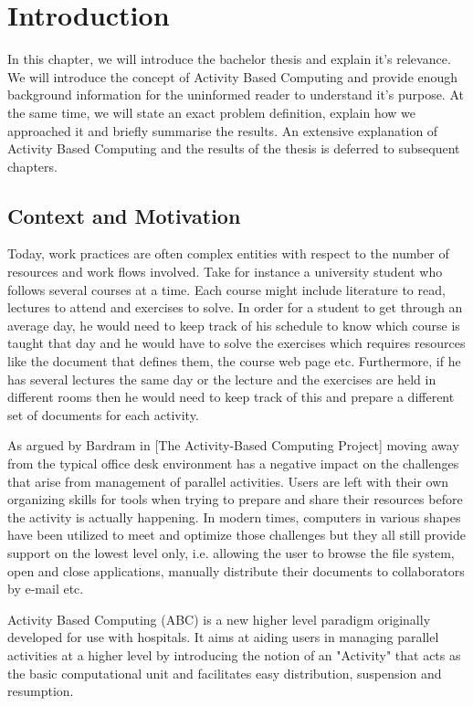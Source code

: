\chapter{Introduction}
In this chapter, we will introduce the bachelor thesis and explain it's relevance. We will introduce the concept of Activity Based Computing and provide enough background information for the uninformed reader to understand it's purpose. At the same time, we will state an exact problem definition, explain how we approached it and briefly summarise the results. An extensive explanation of Activity Based Computing and the results of the thesis is deferred to subsequent chapters.

\section{Context and Motivation}
Today, work practices are often complex entities with respect to the number of resources and work flows involved. Take for instance a university student who follows several courses at a time. Each course might include literature to read, lectures to attend and exercises to solve. In order for a student to get through an average day, he would need to keep track of his schedule to know which course is taught that day and he would have to solve the exercises which requires resources like the document that defines them, the course web page etc. Furthermore, if he has several lectures the same day or the lecture and the exercises are held in different rooms then he would need to keep track of this and prepare a different set of documents for each activity.

As argued by Bardram in [The Activity-Based Computing Project] moving away from the typical office desk environment has a negative impact on the challenges that arise from management of parallel activities. Users are left with their own organizing skills for tools when trying to prepare and share their resources before the activity is actually happening. In modern times, computers in various shapes have been utilized to meet and optimize those challenges but they all still provide support on the lowest level only, i.e. allowing the user to browse the file system, open and close applications, manually distribute their documents to collaborators by e-mail etc.

Activity Based Computing (ABC) is a new higher level paradigm originally developed for use with hospitals. It aims at aiding users in managing parallel activities at a higher level by introducing the notion of an "Activity" that acts as the basic computational unit and facilitates easy distribution, suspension and resumption.

